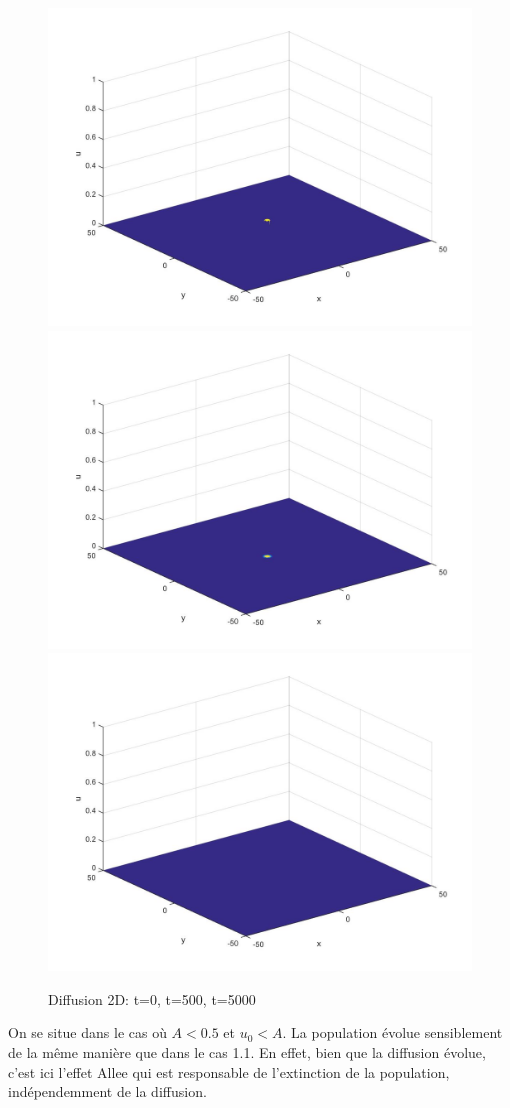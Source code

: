 \documentclass[a4paper,11pt]{article}
\begin{document}
\begin{figure}[H]
	\centering
	\includegraphics[width=0.3\linewidth]{Allee/211__1_}\hfill
    \includegraphics[width=0.3\linewidth]{Allee/211__2_}\hfill
	\includegraphics[width=0.3\linewidth]{Allee/211__3_}
    \caption{Diffusion 2D: t=0, t=500, t=5000}
\end{figure}
On se situe dans le cas où $A<0.5$ et $u_0<A$. La population évolue sensiblement de la même manière que dans le cas 1.1. En effet, bien que la diffusion évolue, c'est ici l'effet Allee qui est responsable de l'extinction de la population, indépendemment de la diffusion.
\end{document}
